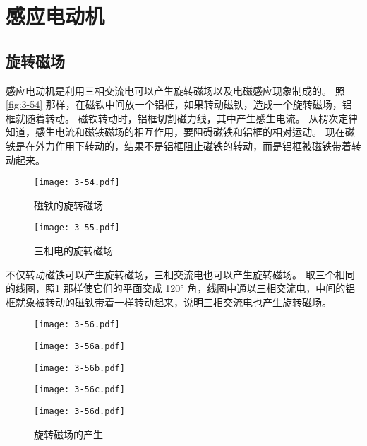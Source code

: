 \section{感应电动机}
\subsection{旋转磁场}
感应电动机是利用三相交流电可以产生旋转磁场以及电磁感应现象制成的。
照\cref{fig:3-54} 那样，在磁铁中间放一个铝框，如果转动磁铁，造成一个旋转磁场，铝框就随着转动。
磁铁转动时，铝框切割磁力线，其中产生感生电流。
从楞次定律知道，感生电流和磁铁磁场的相互作用，要阻碍磁铁和铝框的相对运动。
现在磁铁是在外力作用下转动的，结果不是铝框阻止磁铁的转动，而是铝框被磁铁带着转动起来。

\begin{figure}
	\begin{minipage}[b]{0.48\linewidth}\centering
    \texttt{[image: 3-54.pdf]}
    \caption{磁铁的旋转磁场}\label{fig:3-54}
	\end{minipage}
	\begin{minipage}[b]{0.48\linewidth}\centering
    \texttt{[image: 3-55.pdf]}
    \caption{三相电的旋转磁场}\label{fig:3-55}
	\end{minipage}
\end{figure}

不仅转动磁铁可以产生旋转磁场，三相交流电也可以产生旋转磁场。
取三个相同的线圈，照\cref{fig:3-55} 那样使它们的平面交成 \ang{120} 角，线圈中通以三相交流电，中间的铝框就象被转动的磁铁带着一样转动起来，说明三相交流电也产生旋转磁场。
\begin{figure}
  \texttt{[image: 3-56.pdf]}
  \begin{minipage}{0.23\linewidth}\centering
    \texttt{[image: 3-56a.pdf]}
    \subcaption{}\label{fig:3-56a}
  \end{minipage}
  \begin{minipage}{0.23\linewidth}\centering
    \texttt{[image: 3-56b.pdf]}
    \subcaption{}\label{fig:3-56b}
  \end{minipage}
  \begin{minipage}{0.23\linewidth}\centering
    \texttt{[image: 3-56c.pdf]}
    \subcaption{}\label{fig:3-56c}
  \end{minipage}
  \begin{minipage}{0.23\linewidth}\centering
    \texttt{[image: 3-56d.pdf]}
    \subcaption{}\label{fig:3-56d}
  \end{minipage}
  \caption{旋转磁场的产生}\label{fig:3-56}
\end{figure}

